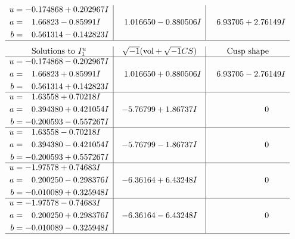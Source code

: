 \documentclass[1p]{elsarticle_modified}
\theoremstyle{definition}
\newcommand{\I}{\sqrt{-1}}
\begin{document}
$$\begin{array}{c|c|c}
\begin{aligned}
u &= -0.174868 + 0.202967 I \\
a &= \phantom{-}1.66823 - 0.85991 I \\
b &= \phantom{-}0.561314 - 0.142823 I\end{aligned}
 & \phantom{-}1.016650 - 0.880506 I & \phantom{-}6.93705 + 2.76149 I\\
 \hline 
 \end{array}$$\newpage$$\begin{array}{c|c|c}  
\text{Solutions to }I^u_{1}& \I (\text{vol} + \sqrt{-1}CS) & \text{Cusp shape}\\
 \hline 
\begin{aligned}
u &= -0.174868 - 0.202967 I \\
a &= \phantom{-}1.66823 + 0.85991 I \\
b &= \phantom{-}0.561314 + 0.142823 I\end{aligned}
 & \phantom{-}1.016650 + 0.880506 I & \phantom{-}6.93705 - 2.76149 I \\ \hline\begin{aligned}
u &= \phantom{-}1.63558 + 0.70218 I \\
a &= \phantom{-}0.394380 + 0.421054 I \\
b &= -0.200593 - 0.557267 I\end{aligned}
 & -5.76799 + 1.86737 I & \phantom{-0.000000 } 0 \\ \hline\begin{aligned}
u &= \phantom{-}1.63558 - 0.70218 I \\
a &= \phantom{-}0.394380 - 0.421054 I \\
b &= -0.200593 + 0.557267 I\end{aligned}
 & -5.76799 - 1.86737 I & \phantom{-0.000000 } 0 \\ \hline\begin{aligned}
u &= -1.97578 + 0.74683 I \\
a &= \phantom{-}0.200250 - 0.298376 I \\
b &= -0.010089 + 0.325948 I\end{aligned}
 & -6.36164 + 6.43248 I & \phantom{-0.000000 } 0 \\ \hline\begin{aligned}
u &= -1.97578 - 0.74683 I \\
a &= \phantom{-}0.200250 + 0.298376 I \\
b &= -0.010089 - 0.325948 I\end{aligned}
 & -6.36164 - 6.43248 I & \phantom{-0.000000 } 0\\
 \hline 
 \end{array}$$\newpage\newpage\renewcommand{\arraystretch}{1}
\end{document}
